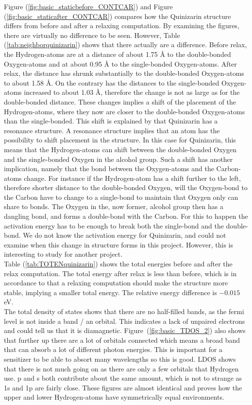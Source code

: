 \documentclass{article}
\begin{document}
    Figure (\ref{fig:basic_staticbefore_CONTCAR}) and Figure (\ref{fig:basic_staticafter_CONTCAR}) compares how the Quinizarin structure differs from before and after a relaxing computation. By examining the figures, there are virtually no difference to be seen. However, Table (\ref{tab:neighborquinizarin}) shows that there actually are a difference. Before relax, the Hydrogen-atoms are at a distance of about 1.75 Å to the double-bonded Oxygen-atoms and at about 0.95 Å to the single-bonded Oxygen-atoms. After relax, the distance has shrunk substantially to the double-bonded Oxygen-atoms to about 1.58 Å. On the contrary has the distances to the single-bonded Oxygen-atoms increased to about 1.03 Å, therefore the change is not as large as for the double-bonded distance. These changes implies a shift of the placement of the Hydrogen-atoms, where they now are closer to the double-bonded Oxygen-atoms than the single-bonded. This shift is explained by that Quinizarin has a resonance structure. A resonance structure implies that an atom has the possibility to shift placement in the structure. In this case for Quinizarin, this means that the Hydrogen-atoms can shift between the double-bonded Oxygen and the single-bonded Oxygen in the alcohol group. Such a shift has another implication, namely that the bond between the Oxygen-atoms and the Carbon-atoms change. For instance if the Hydrogen-atom has a shift further to the left, therefore shorter distance to the double-bonded Oxygen, will the Oxygen-bond to the Carbon have to change to a single-bond to maintain that Oxygen only can share to bonds. The Oxygen in the, now former, alcohol group then has a dangling bond, and forms a double-bond with the Carbon. For this to happen the activation energy has to be enough to break both the single-bond and the double-bond. We do not know the activation energy for Quinizarin, and could not examine when this change in structure forms in this project. However, this is interesting to study for another project. \\

    Table (\ref{tab:TOTENquinizarin}) shows the total energies before and after the relax computation. The total energy after relax is less than before, which is in accordance to that a relaxing computation should make the structure more stable, implying a smaller total energy. The relative energy difference is $-0.015$ eV. \\

    The total density of states shows that there are no half-filled bands, as the fermi level is not inside a band / an orbital. This indicates a lack of unpaired electrons and could tell us that it is diamagnetic. Figure~(\ref{fig:basic_TDOS_2}) also shows that further up there are a lot of orbitals connected which means a broad band that can absorb a lot of different photon energies. This is important for a sensitizer to be able to absort many wavelengths so this is good. LDOS shows that there is not much going on as there are only a few orbitals that Hydrogen use. p and s both contribute about the same amount, which is not to strange as 1s and 1p are fairly close. These figures are almost identical and proves how the upper and lower Hydrogen-atoms have symmetrically equal environments. \\
\end{document}
